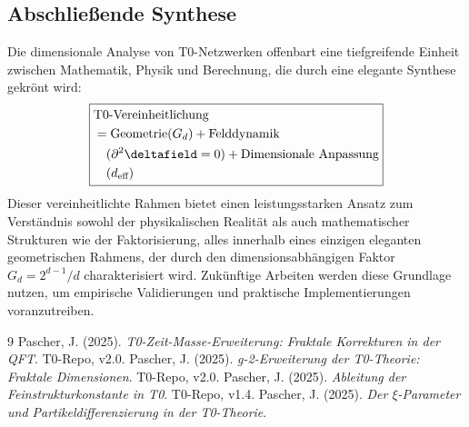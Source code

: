 \subsection{Abschließende Synthese}
\label{subsec:final_synthesis}
Die dimensionale Analyse von T0-Netzwerken offenbart eine tiefgreifende Einheit zwischen Mathematik, Physik und Berechnung, die durch eine elegante Synthese gekrönt wird:
\begin{equation}
	\begin{split}
		\boxed{
			\begin{aligned}
				&\text{T0-Vereinheitlichung} \\
				&= \text{Geometrie} (G_d) + \text{Felddynamik} \\
				&\quad (\partial^2\deltafield = 0) + \text{Dimensionale Anpassung} \\
				&\quad (d_{\text{eff}})
			\end{aligned}
		}
	\end{split}
\end{equation}
Dieser vereinheitlichte Rahmen bietet einen leistungsstarken Ansatz zum Verständnis sowohl der physikalischen Realität als auch mathematischer Strukturen wie der Faktorisierung, alles innerhalb eines einzigen eleganten geometrischen Rahmens, der durch den dimensionsabhängigen Faktor $G_d = 2^{d-1}/d$ charakterisiert wird. Zukünftige Arbeiten werden diese Grundlage nutzen, um empirische Validierungen und praktische Implementierungen voranzutreiben.
\begin{thebibliography}{9}
	Pascher, J. (2025). \textit{T0-Zeit-Masse-Erweiterung: Fraktale Korrekturen in der QFT}. T0-Repo, v2.0.
	Pascher, J. (2025). \textit{g-2-Erweiterung der T0-Theorie: Fraktale Dimensionen}. T0-Repo, v2.0.
	Pascher, J. (2025). \textit{Ableitung der Feinstrukturkonstante in T0}. T0-Repo, v1.4.
	Pascher, J. (2025). \textit{Der $\xi$-Parameter und Partikeldifferenzierung in der T0-Theorie}.
\end{thebibliography}